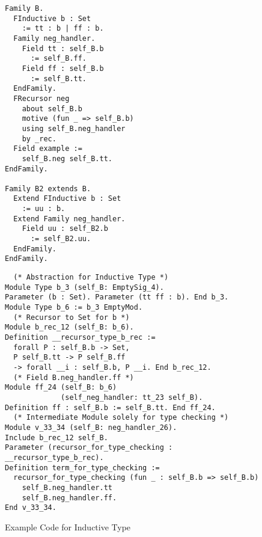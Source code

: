 \begin{figure}[!htb]
  \begin{minipage}[t]{0.32\linewidth}
\begin{verbatim}
Family B.
  FInductive b : Set 
    := tt : b | ff : b.
  Family neg_handler. 
    Field tt : self_B.b 
      := self_B.ff.
    Field ff : self_B.b 
      := self_B.tt.
  EndFamily.
  FRecursor neg 
    about self_B.b 
    motive (fun _ => self_B.b)
    using self_B.neg_handler
    by _rec.
  Field example := 
    self_B.neg self_B.tt. 
EndFamily.

Family B2 extends B.
  Extend FInductive b : Set 
    := uu : b.
  Extend Family neg_handler.
    Field uu : self_B2.b 
      := self_B2.uu.
  EndFamily. 
EndFamily.
\end{verbatim}
  \end{minipage}
  \begin{minipage}[t]{0.65\linewidth}
\begin{verbatim}
  (* Abstraction for Inductive Type *)
Module Type b_3 (self_B: EmptySig_4).
Parameter (b : Set). Parameter (tt ff : b). End b_3.      
Module Type b_6 := b_3 EmptyMod.
  (* Recursor to Set for b *)
Module b_rec_12 (self_B: b_6).
Definition __recursor_type_b_rec :=
  forall P : self_B.b -> Set,
  P self_B.tt -> P self_B.ff 
  -> forall __i : self_B.b, P __i. End b_rec_12. 
  (* Field B.neg_handler.ff *)
Module ff_24 (self_B: b_6) 
             (self_neg_handler: tt_23 self_B).
Definition ff : self_B.b := self_B.tt. End ff_24.
  (* Intermediate Module solely for type checking *)
Module v_33_34 (self_B: neg_handler_26).
Include b_rec_12 self_B.
Parameter (recursor_for_type_checking : __recursor_type_b_rec).
Definition term_for_type_checking :=
  recursor_for_type_checking (fun _ : self_B.b => self_B.b)
    self_B.neg_handler.tt
    self_B.neg_handler.ff.  
End v_33_34.
\end{verbatim}
  \end{minipage}
\caption{Example Code for Inductive Type}\label{fig:plugin-example2}
\end{figure}

